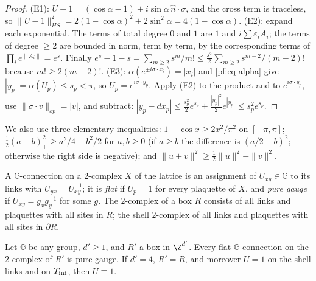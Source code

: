 \begin{proof}
(E1): $U-1=(\cos\alpha-1)+i\sin\alpha\,\hat n\cdot\sigma$, and the cross term is traceless, so $\|U-1\|_{HS}^2=2(1-\cos\alpha)^2+2\sin^2\alpha=4(1-\cos\alpha)$.
(E2): expand each exponential. The terms of total degree $0$ and $1$ are $1$ and $i\sum\varepsilon_iA_i$; the terms of degree $\ge2$ are bounded in norm, term by term, by the corresponding terms of $\prod_ie^{\|A_i\|}=e^s$. Finally $e^s-1-s=\sum_{m\ge2}s^m/m!\le\frac{s^2}2\sum_{m\ge2}s^{m-2}/(m-2)!$ because $m!\ge2(m-2)!$.
(E3): $\alpha(e^{\pm i\sigma\cdot x_i})=|x_i|$ and \eqref{pf:eq-alpha} give $|y_p|=\alpha(U_p)\le s_p<\pi$, so $U_p=e^{i\sigma\cdot y_p}$. Apply (E2) to the product and to $e^{i\sigma\cdot y_p}$, use $\|\sigma\cdot v\|_{op}=|v|$, and subtract: $|y_p-dx_p|\le\frac{s_p^2}2e^{s_p}+\frac{|y_p|^2}2e^{|y_p|}\le s_p^2e^{s_p}$.
\end{proof}

We also use three elementary inequalities: $1-\cos x\ge2x^2/\pi^2$ on $[-\pi,\pi]$; $\tfrac12(a-b)_+^2\ge a^2/4-b^2/2$ for $a,b\ge0$ (if $a\ge b$ the difference is $(a/2-b)^2$; otherwise the right side is negative); and $\|u+v\|^2\ge\tfrac12\|u\|^2-\|v\|^2$.

A $\mathbb G$-connection on a $2$-complex $X$ of the lattice is an assignment of $U_{xy}\in\mathbb G$ to its links with $U_{yx}=U_{xy}^{-1}$; it is \emph{flat} if $U_p=1$ for every plaquette of $X$, and \emph{pure gauge} if $U_{xy}=g_xg_y^{-1}$ for some $g$. The $2$-complex of a box $R$ consists of all links and plaquettes with all sites in $R$; the shell $2$-complex of all links and plaquettes with all sites in $\partial R$.

\begin{lemma}\label{pf:lem-flat}
Let $\mathbb G$ be any group, $d'\ge1$, and $R'$ a box in $\Z^{d'}$. Every flat $\mathbb G$-connection on the $2$-complex of $R'$ is pure gauge. If $d'=4$, $R'=R$, and moreover $U=1$ on the shell links and on $T_{\rm int}$, then $U\equiv1$.
\end{lemma}

